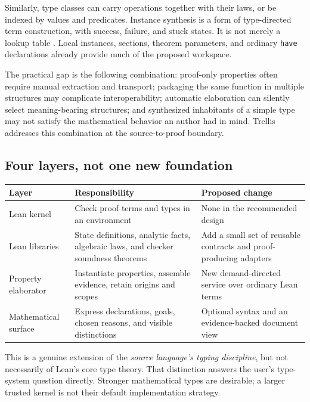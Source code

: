 \documentclass[11pt,a4paper]{article}
\theoremstyle{definition}
\theoremstyle{remark}
\newcommand{\code}[1]{\texttt{#1}}
\begin{document}
Similarly, type classes can carry operations together with their laws, or be indexed by values and predicates. Instance synthesis is a form of type-directed term construction, with success, failure, and stuck states. It is not merely a lookup table \cite{leanClasses,leanInstances}. Local instances, sections, theorem parameters, and ordinary \code{have} declarations already provide much of the proposed workspace.

The practical gap is the following combination: proof-only properties often require manual extraction and transport; packaging the same function in multiple structures may complicate interoperability; automatic elaboration can silently select meaning-bearing structures; and synthesized inhabitants of a simple type may not satisfy the mathematical behavior an author had in mind. Trellis addresses this combination at the source-to-proof boundary.

\subsection{Four layers, not one new foundation}
\begin{center}
\begin{tabularx}{\textwidth}{@{}L{34mm}YY@{}}
\toprule
Layer & Responsibility & Proposed change\\
\midrule
Lean kernel & Check proof terms and types in an environment & None in the recommended design\\
Lean libraries & State definitions, analytic facts, algebraic laws, and checker soundness theorems & Add a small set of reusable contracts and proof-producing adapters\\
Property elaborator & Instantiate properties, assemble evidence, retain origins and scopes & New demand-directed service over ordinary Lean terms\\
Mathematical surface & Express declarations, goals, chosen reasons, and visible distinctions & Optional syntax and an evidence-backed document view\\
\bottomrule
\end{tabularx}
\end{center}

This is a genuine extension of the \emph{source language's typing discipline}, but not necessarily of Lean's core type theory. That distinction answers the user's type-system question directly. Stronger mathematical types are desirable; a larger trusted kernel is not their default implementation strategy.
\end{document}
